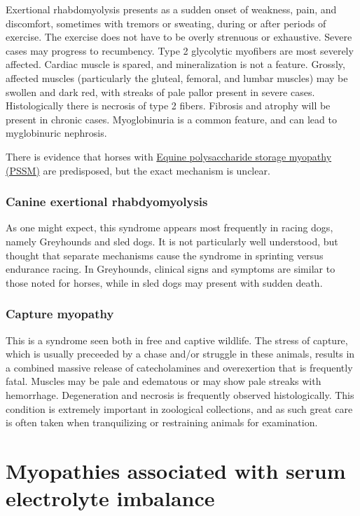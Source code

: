 \documentclass[openany]{book}
\begin{document}
Exertional rhabdomyolysis presents as a sudden onset of weakness, pain,
and discomfort, sometimes with tremors or sweating, during or after
periods of exercise. The exercise does not have to be overly strenuous
or exhaustive. Severe cases may progress to recumbency. Type 2
glycolytic myofibers are most severely affected. Cardiac muscle is
spared, and mineralization is not a feature. Grossly, affected muscles
(particularly the gluteal, femoral, and lumbar muscles) may be swollen
and dark red, with streaks of pale pallor present in severe cases.
Histologically there is necrosis of type 2 fibers. Fibrosis and atrophy
will be present in chronic cases. Myoglobinuria is a common feature, and
can lead to myglobinuric nephrosis.

There is evidence that horses with
\protect\hyperlink{equine-polysaccharide-storage-myopathy-pssm}{Equine
polysaccharide storage myopathy (PSSM)} are predisposed, but the exact
mechanism is unclear.

\subsection{Canine exertional
rhabdyomyolysis}\label{canine-exertional-rhabdyomyolysis}

As one might expect, this syndrome appears most frequently in racing
dogs, namely Greyhounds and sled dogs. It is not particularly well
understood, but thought that separate mechanisms cause the syndrome in
sprinting versus endurance racing. In Greyhounds, clinical signs and
symptoms are similar to those noted for horses, while in sled dogs may
present with sudden death.

\subsection{Capture myopathy}\label{capture-myopathy}

This is a syndrome seen both in free and captive wildlife. The stress of
capture, which is usually preceeded by a chase and/or struggle in these
animals, results in a combined massive release of catecholamines and
overexertion that is frequently fatal. Muscles may be pale and edematous
or may show pale streaks with hemorrhage. Degeneration and necrosis is
frequently observed histologically. This condition is extremely
important in zoological collections, and as such great care is often
taken when tranquilizing or restraining animals for examination.

\chapter{Myopathies associated with serum electrolyte
imbalance}\label{myopathies-associated-with-serum-electrolyte-imbalance}
\end{document}

